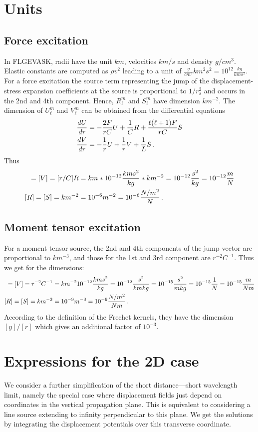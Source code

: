 \documentclass[12pt,a4paper]{article}
\begin{document}
\section{Units}
\subsection{Force excitation}
In FLGEVASK, radii have the unit $km$, velocities $km/s$ and density $g/cm^3$. Elastic constants are computed as $\rho v^2$ leading to a unit of $\frac{g}{cm^3}{km^2}{s^2} = 10^{12} \frac{kg}{km s^2}$.  
For a force excitation the source term representing the jump of the displacement-stress expansion coefficients at the source is proportional to $1/r_s^2$ and occurs in the 2nd and 4th component. Hence, $R_\ell^m$ and $S_\ell^m$ have dimension $km^{-2}$.
The dimension of $U_\ell^m$ and $V_\ell^m$ can be obtained from the differential equations
\begin{align}
\frac{dU}{dr} &=-\frac{2F}{rC}U+\frac{1}{C}R+\frac{\ell(\ell+1)F}{rC} S \notag \\
\frac{dV}{dr} &=-\frac{1}{r}U+\frac{1}{r}V+\frac{1}{L}S \notag \,.
\end{align}
Thus
\begin{align}
[U] = [V] = [r/C]R  &= km*10^{-12}\frac{km s^2}{kg}*km^{-2} = 10^{-12}\frac{s^2}{kg} = 10^{-12}\frac{m}{N} \notag \\
[R] = [S] = km^{-2} &= 10^{-6} m^{-2} = 10^{-6} \frac{N/m^2}{N} \notag \,.
\end{align}
%
\subsection{Moment tensor excitation}
For a moment tensor source, the 2nd and 4th components of the jump vector are proportional to $km^{-3}$, and those for the 1st and 3rd component are $r^{-2}C^{-1}$. Thus we get for the dimensions:
\begin{align}
[U] = [V] =  r^{-2}C^{-1} &= km^{-2} 10^{-12}\frac{km s^2}{kg} = 10^{-12}\frac{s^2}{km kg} =  10^{-15}\frac{s^2}{m kg} = 10^{-15}\frac{1}{N} = 10^{-15}\frac{m}{Nm} \notag \\
[R] = [S] = km^{-3} &= 10^{-9} m^{-3} = 10^{-9} \frac{N/m^2}{Nm} \notag \,.
\end{align}
According to the definition of the Frechet kernels, they have the dimension $[y]/[r]$ which gives an additional factor of $10^{-3}$.
\section{Expressions for the 2D case}
We consider a further simplification of the short distance---short wavelength limit, namely the special case where displacement fields just
depend on coordinates in the vertical propagation plane. This is equivalent to considering a line source extending to infinity perpendicular
to this plane. We get the solutions by integrating the displacement potentials over this transverse coordinate.
%
\end{document}
